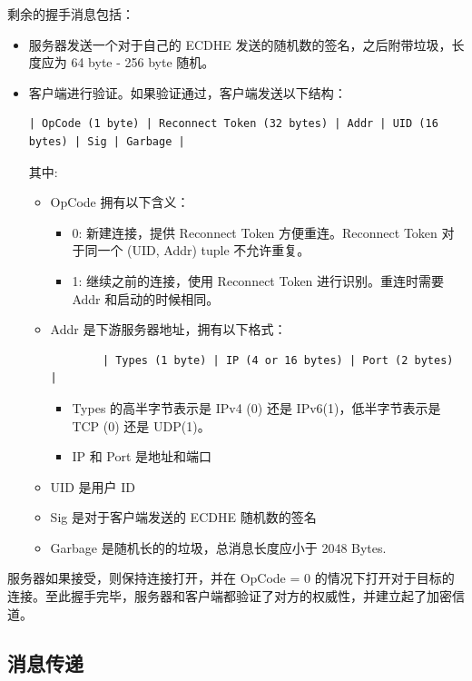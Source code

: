 \documentclass{ctexart}
\begin{document}
  剩余的握手消息包括：

  \begin{itemize}
    \item 服务器发送一个对于自己的 ECDHE 发送的随机数的签名，之后附带垃圾，长度应为 64 byte - 256 byte 随机。
    \item 客户端进行验证。如果验证通过，客户端发送以下结构：

    \begin{verbatim}
| OpCode (1 byte) | Reconnect Token (32 bytes) | Addr | UID (16 bytes) | Sig | Garbage |
    \end{verbatim}

    其中:
    \begin{itemize}
      \item OpCode 拥有以下含义：
      \begin{itemize}
        \item 0: 新建连接，提供 Reconnect Token 方便重连。Reconnect Token 对于同一个 (UID, Addr) tuple 不允许重复。
        \item 1: 继续之前的连接，使用 Reconnect Token 进行识别。重连时需要 Addr 和启动的时候相同。
      \end{itemize}
      \item Addr 是下游服务器地址，拥有以下格式：
      \begin{verbatim}
        | Types (1 byte) | IP (4 or 16 bytes) | Port (2 bytes) |
      \end{verbatim}
      \begin{itemize}
        \item Types 的高半字节表示是 IPv4 (0) 还是 IPv6(1)，低半字节表示是 TCP (0) 还是 UDP(1)。
        \item IP 和 Port 是地址和端口
      \end{itemize}
      \item UID 是用户 ID
      \item Sig 是对于客户端发送的 ECDHE 随机数的签名
      \item Garbage 是随机长的的垃圾，总消息长度应小于 2048 Bytes.
    \end{itemize} 
  \end{itemize}

  服务器如果接受，则保持连接打开，并在 OpCode = 0 的情况下打开对于目标的连接。至此握手完毕，服务器和客户端都验证了对方的权威性，并建立起了加密信道。

  \subsection{消息传递}
\end{document}
